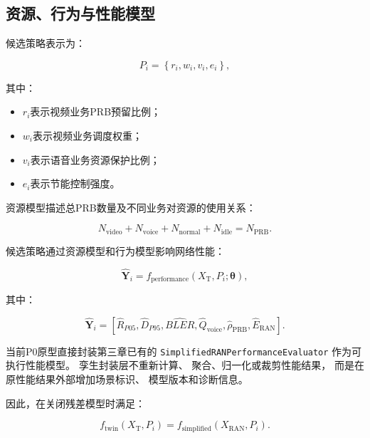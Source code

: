 \documentclass[lang=cn,12pt]{elegantbook}
\begin{document}
\subsection*{资源、行为与性能模型}

候选策略表示为：

\begin{equation}
P_i
=
\left\{
r_i,
w_i,
v_i,
e_i
\right\},
\label{eq:candidate_policy_vector_twin}
\end{equation}

其中：

\begin{itemize}
    \item $r_i$表示视频业务PRB预留比例；
    \item $w_i$表示视频业务调度权重；
    \item $v_i$表示语音业务资源保护比例；
    \item $e_i$表示节能控制强度。
\end{itemize}

资源模型描述总PRB数量及不同业务对资源的使用关系：

\begin{equation}
N_{\mathrm{video}}
+
N_{\mathrm{voice}}
+
N_{\mathrm{normal}}
+
N_{\mathrm{idle}}
=
N_{\mathrm{PRB}}.
\label{eq:prb_resource_conservation}
\end{equation}

候选策略通过资源模型和行为模型影响网络性能：

\begin{equation}
\hat{\boldsymbol{Y}}_i
=
f_{\mathrm{performance}}
\left(
X_{\mathrm{T}},
P_i;
\boldsymbol{\theta}
\right),
\label{eq:twin_performance_model}
\end{equation}

其中：

\begin{equation}
\hat{\boldsymbol{Y}}_i
=
\left[
\hat{R}_{P05},
\hat{D}_{P95},
\widehat{BLER},
\hat{Q}_{\mathrm{voice}},
\hat{\rho}_{\mathrm{PRB}},
\hat{E}_{\mathrm{RAN}}
\right].
\label{eq:twin_prediction_output}
\end{equation}

当前P0原型直接封装第三章已有的
\texttt{SimplifiedRANPerformanceEvaluator}
作为可执行性能模型。
孪生封装层不重新计算、
聚合、归一化或裁剪性能结果，
而是在原性能结果外部增加场景标识、
模型版本和诊断信息。

因此，在关闭残差模型时满足：

\begin{equation}
f_{\mathrm{twin}}
\left(
X_{\mathrm{T}},
P_i
\right)
=
f_{\mathrm{simplified}}
\left(
X_{\mathrm{RAN}},
P_i
\right).
\label{eq:twin_model_parity}
\end{equation}
\end{document}
